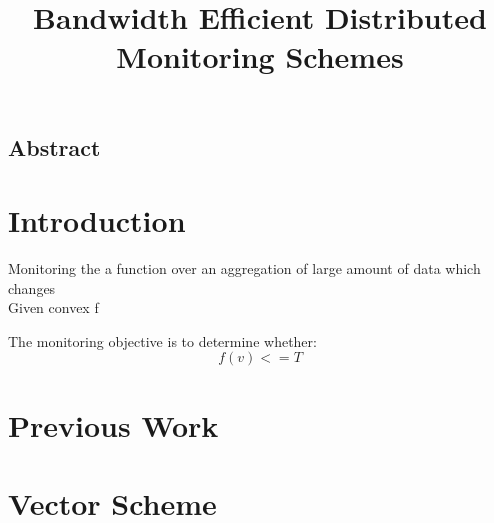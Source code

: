 \documentclass[10pt,a4paper]{article}
\begin{document}
\onehalfspacing
\sloppy
\setlength{\parindent}{0pt}


\title{Bandwidth Efficient Distributed Monitoring Schemes}
\date{}
\maketitle


\begin{multicols*}{2}
\begin{center}
\section*{Abstract}
\end{center}

\section{Introduction}
Monitoring the a function over an aggregation of large amount of data which changes \\

Given convex f \label{fConvexity}

The monitoring objective is to determine whether:
\begin{equation}
\label{monitoringConstraint}
f(v) <= T
\end{equation}


\section{Previous Work}

\section{Vector Scheme}


\end{multicols*}
\end{document}
